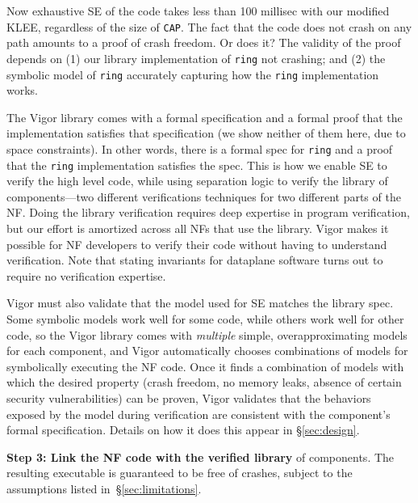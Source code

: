\documentclass[letterpaper,twocolumn,10pt]{article}
\newcommand{\code}[1]{\texttt{#1}}
\begin{document}
Now exhaustive SE of the code takes less than 100 millisec with our modified KLEE, regardless of the size of \code{CAP}.  The fact that the code does not crash on any path amounts to a proof of crash freedom. Or does it? The validity of the proof depends on (1)  our library implementation of \code{ring} not crashing; and (2) the symbolic model of \code{ring} accurately capturing how the \code{ring} implementation works.

The Vigor library comes with a formal specification and a formal proof that the implementation satisfies that specification (we show neither of them here, due to space constraints). In other words, there is a formal spec for \code{ring} and a proof that the \code{ring} implementation satisfies the spec. This is how we enable SE to verify the high level code, while using separation logic to verify the library of components---two different verifications techniques for two different parts of the NF. Doing the library verification requires deep expertise in program verification, but our effort is amortized across all NFs that use the library. Vigor makes it possible for NF developers to verify their code without having to understand verification. Note that stating invariants for dataplane software turns out to require no verification expertise.

Vigor must also validate that the model used for SE matches the library spec. Some symbolic models work well for some code, while others work well for other code, so the Vigor library comes with {\em multiple} simple, overapproximating models for each component, and Vigor automatically chooses combinations of models for symbolically executing the NF code. Once it finds a combination of models with which the desired property (crash freedom, no memory leaks, absence of certain security vulnerabilities) can be proven, Vigor validates that the behaviors exposed by the model during verification are consistent with the component's formal specification.  Details on how it does this appear in \S\ref{sec:design}.
 
{\bf Step 3: Link the NF code with the verified library} of components. The resulting executable is guaranteed to be free of crashes, subject to the assumptions listed in~\S\ref{sec:limitations}.


\end{document}
